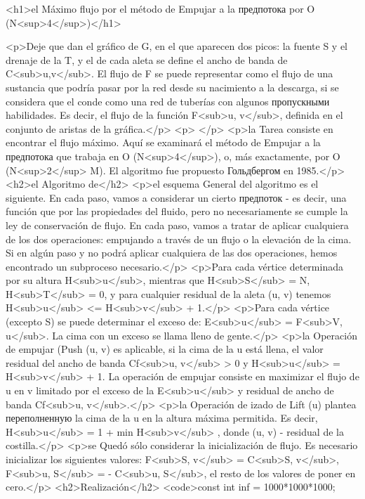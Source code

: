 <h1>el Máximo flujo por el método de Empujar a la предпотока por O (N<sup>4</sup>)</h1>

<p>Deje que dan el gráfico de G, en el que aparecen dos picos: la fuente S y el drenaje de la T, y el de cada aleta se define el ancho de banda de C<sub>u,v</sub>. El flujo de F se puede representar como el flujo de una sustancia que podría pasar por la red desde su nacimiento a la descarga, si se considera que el conde como una red de tuberías con algunos пропускными habilidades. Es decir, el flujo de la función F<sub>u, v</sub>, definida en el conjunto de aristas de la gráfica.</p>
<p> </p>
<p>la Tarea consiste en encontrar el flujo máximo. Aquí se examinará el método de Empujar a la предпотока que trabaja en O (N<sup>4</sup>), o, más exactamente, por O (N<sup>2</sup> M). El algoritmo fue propuesto Гольдбергом en 1985.</p>
<h2>el Algoritmo de</h2>
<p>el esquema General del algoritmo es el siguiente. En cada paso, vamos a considerar un cierto предпоток - es decir, una función que por las propiedades del fluido, pero no necesariamente se cumple la ley de conservación de flujo. En cada paso, vamos a tratar de aplicar cualquiera de los dos operaciones: empujando a través de un flujo o la elevación de la cima. Si en algún paso y no podrá aplicar cualquiera de las dos operaciones, hemos encontrado un subproceso necesario.</p>
<p>Para cada vértice determinada por su altura H<sub>u</sub>, mientras que H<sub>S</sub> = N, H<sub>T</sub> = 0, y para cualquier residual de la aleta (u, v) tenemos H<sub>u</sub> <= H<sub>v</sub> + 1.</p>
<p>Para cada vértice (excepto S) se puede determinar el exceso de: E<sub>u</sub> = F<sub>V, u</sub>. La cima con un exceso se llama lleno de gente.</p>
<p>la Operación de empujar (Push (u, v) es aplicable, si la cima de la u está llena, el valor residual del ancho de banda Cf<sub>u, v</sub> > 0 y H<sub>u</sub> = H<sub>v</sub> + 1. La operación de empujar consiste en maximizar el flujo de u en v limitado por el exceso de la E<sub>u</sub> y residual de ancho de banda Cf<sub>u, v</sub>.</p>
<p>la Operación de izado de Lift (u) plantea переполненную la cima de la u en la altura máxima permitida. Es decir, H<sub>u</sub> = 1 + min { H<sub>v</sub> }, donde (u, v) - residual de la costilla.</p>
<p>se Quedó sólo considerar la inicialización de flujo. Es necesario inicializar los siguientes valores: F<sub>S, v</sub> = C<sub>S, v</sub>, F<sub>u, S</sub> = - C<sub>u, S</sub>, el resto de los valores de poner en cero.</p>
<h2>Realización</h2>
<code>const int inf = 1000*1000*1000;


